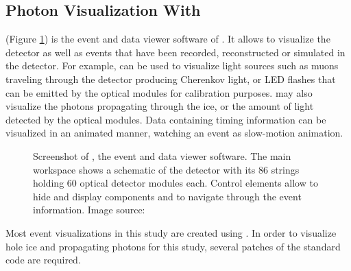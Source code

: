 
\subsection{Photon Visualization With \steamshovel}

\steamshovel (Figure \ref{fig:steamshovel}) is the event and data viewer software of \icecube. It allows to visualize the \icecube detector as well as events that have been recorded, reconstructed or simulated in the detector.
For example, \steamshovel can be used to visualize light sources such as muons traveling through the detector producing Cherenkov light, or LED flashes that can be emitted by the optical modules for calibration purposes. \steamshovel may also visualize the photons propagating through the ice, or the amount of light detected by the optical modules.
Data containing timing information can be visualized in an animated manner, watching an event as slow-motion animation.

\begin{figure}[htbp]
  \caption{Screenshot of \steamshovel, the \icecube event and data viewer software. The main workspace shows a schematic of the \icecube detector with its 86 strings holding 60 optical detector modules each. Control elements allow to hide and display components and to navigate through the event information. Image source: \cite{steamshoveldocumentation}}
  \label{fig:steamshovel}
\end{figure}

Most event visualizations in this study are created using \steamshovel.
In order to visualize hole ice and propagating photons for this study, several patches of the standard \steamshovel code are required.

